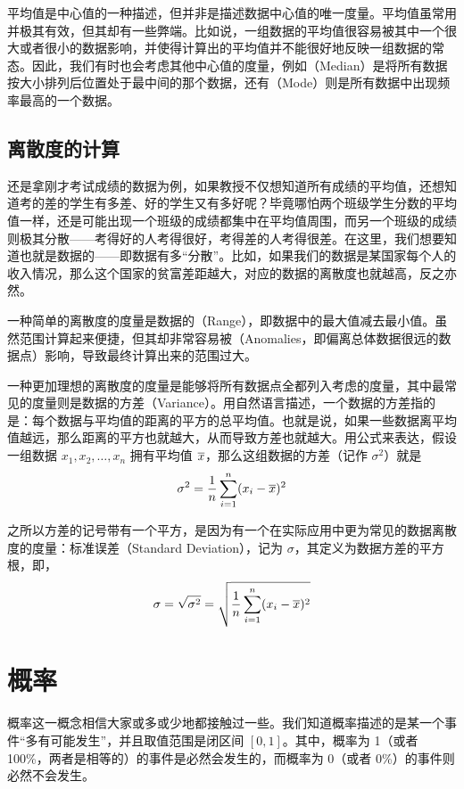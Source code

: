 \documentclass{styles/main}
\begin{document}
  平均值是中心值的一种描述，但并非是描述数据中心值的唯一度量。平均值虽常用并极其有效，但其却有一些弊端。比如说，一组数据的平均值很容易被其中一个很大或者很小的数据影响，并使得计算出的平均值并不能很好地反映一组数据的常态。因此，我们有时也会考虑其他中心值的度量，例如（Median）是将所有数据按大小排列后位置处于最中间的那个数据，还有（Mode）则是所有数据中出现频率最高的一个数据。


\subsection{离散度的计算}
  
  还是拿刚才考试成绩的数据为例，如果教授不仅想知道所有成绩的平均值，还想知道考的差的学生有多差、好的学生又有多好呢？毕竟哪怕两个班级学生分数的平均值一样，还是可能出现一个班级的成绩都集中在平均值周围，而另一个班级的成绩则极其分散——考得好的人考得很好，考得差的人考得很差。在这里，我们想要知道也就是数据的——即数据有多``分散''。比如，如果我们的数据是某国家每个人的收入情况，那么这个国家的贫富差距越大，对应的数据的离散度也就越高，反之亦然。
  
  一种简单的离散度的度量是数据的（Range），即数据中的最大值减去最小值。虽然范围计算起来便捷，但其却非常容易被（Anomalies，即偏离总体数据很远的数据点）影响，导致最终计算出来的范围过大。
  
  一种更加理想的离散度的度量是能够将所有数据点全都列入考虑的度量，其中最常见的度量则是数据的方差（Variance）。用自然语言描述，一个数据的方差指的是：每个数据与平均值的距离的平方的总平均值。也就是说，如果一些数据离平均值越远，那么距离的平方也就越大，从而导致方差也就越大。用公式来表达，假设一组数据 $x_1, x_2, \dots, x_n$ 拥有平均值 $\overline{x}$，那么这组数据的方差（记作 $\sigma^2$）就是
  \[ \sigma^2 = \frac{1}{n} \sum_{i=1}^n (x_i - \overline{x})^2 \]
  
  之所以方差的记号带有一个平方，是因为有一个在实际应用中更为常见的数据离散度的度量：标准误差（Standard Deviation），记为 $\sigma$，其定义为数据方差的平方根，即，
  \[ \sigma = \sqrt{\sigma^2} = \sqrt{\frac{1}{n} \sum_{i=1}^n (x_i - \overline{x})^2} \]



\newpage
\section{概率}

概率这一概念相信大家或多或少地都接触过一些。我们知道概率描述的是某一个事件``多有可能发生''，并且取值范围是闭区间 $[0, 1]$。其中，概率为 1（或者 100\%，两者是相等的）的事件是必然会发生的，而概率为 0（或者 0\%）的事件则必然不会发生。
\end{document}
